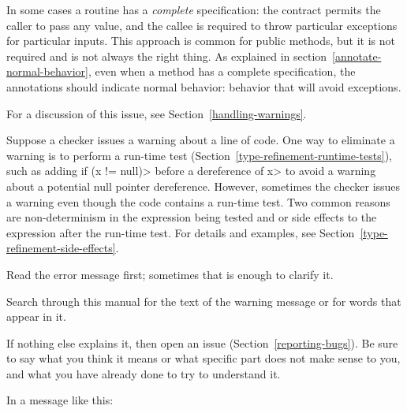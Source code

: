 In some cases a routine has a \emph{complete} specification:  the contract
permits the caller to pass any value, and the callee is required to throw
particular exceptions for particular inputs.  This approach is common for
public methods, but it is not required and is not always the right thing.
As explained in section~\ref{annotate-normal-behavior}, even when a method
has a complete specification, the annotations should indicate normal
behavior:  behavior that will avoid exceptions.





For a discussion of this issue, see Section~\ref{handling-warnings}.



Suppose a checker issues a warning about a line of code.  One way to
eliminate a warning is to perform a run-time test
(Section~\ref{type-refinement-runtime-tests}), such as adding \<if (x !=
null)> before a dereference of \<x> to avoid a warning about a potential
null pointer dereference.  However, sometimes the checker issues a warning
even though the code contains a run-time test.  Two common reasons are
non-determinism in the expression being tested and or side effects to the
expression after the run-time test.  For details and examples, see
Section~\ref{type-refinement-side-effects}.



Read the error message first; sometimes that is enough to clarify it.

Search through this manual for the text of the warning message or for words
that appear in it.

If nothing else explains it, then
open an issue (Section~\ref{reporting-bugs}).
Be sure to say what you think it means or what specific part does
not make sense to you, and what you have already done to try to understand it.


In a message like this:

